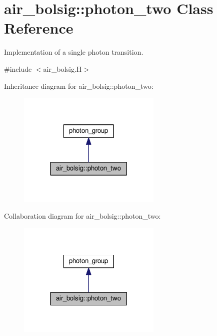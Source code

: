 \hypertarget{classair__bolsig_1_1photon__two}{}\section{air\+\_\+bolsig\+:\+:photon\+\_\+two Class Reference}
\label{classair__bolsig_1_1photon__two}


Implementation of a single photon transition.  




{\ttfamily \#include $<$air\+\_\+bolsig.\+H$>$}



Inheritance diagram for air\+\_\+bolsig\+:\+:photon\+\_\+two\+:\nopagebreak
\begin{figure}[H]
\begin{center}
\leavevmode
\includegraphics[width=194pt]{classair__bolsig_1_1photon__two__inherit__graph}
\end{center}
\end{figure}


Collaboration diagram for air\+\_\+bolsig\+:\+:photon\+\_\+two\+:\nopagebreak
\begin{figure}[H]
\begin{center}
\leavevmode
\includegraphics[width=194pt]{classair__bolsig_1_1photon__two__coll__graph}
\end{center}
\end{figure}
